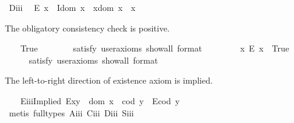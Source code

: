 \begin{isabellebody}
\ D\isactrlsub i\isactrlsub i\isactrlsub i{\isacharcolon}\ %
\ {\isachardoublequoteopen}E\ x\ \isactrlbold {\isasymrightarrow}\ {\isacharparenleft}I{\isacharparenleft}dom\ x{\isacharparenright}\ \isactrlbold {\isasymand}\ x{\isasymcdot}{\isacharparenleft}dom\ x{\isacharparenright}\ {\isasymcong}\ x{\isacharparenright}{\isachardoublequoteclose}%
\begin{isamarkuptext}%
The obligatory consistency check is positive.%
\end{isamarkuptext}\isamarkuptrue%
\ \ \isamarkupfalse%
\ True\ \ %
\isanewline
\ \ \ \ \isamarkupfalse%
\ {\isacharbrackleft}satisfy{\isacharcomma}\ user{\isacharunderscore}axioms{\isacharcomma}\ show{\isacharunderscore}all{\isacharcomma}\ format\ {\isacharequal}\ {}{\isacharbrackright}%
\isadelimproof
\ %
\endisadelimproof
%
\isatagproof
{}\isamarkupfalse%
%
\endisatagproof
{\isafoldproof}%
%
\isadelimproof
%
\endisadelimproof
\isanewline
\ \ \isamarkupfalse%
\ \ {\isachardoublequoteopen}{\isasymexists}x{\isachardot}\ \isactrlbold {\isasymnot}{\isacharparenleft}E\ x{\isacharparenright}{\isachardoublequoteclose}\ \ True\ \ %
\ \isanewline
\ \ \ \ \isamarkupfalse%
\ {\isacharbrackleft}satisfy{\isacharcomma}\ user{\isacharunderscore}axioms{\isacharcomma}\ show{\isacharunderscore}all{\isacharcomma}\ format\ {\isacharequal}\ {}{\isacharbrackright}%
\isadelimproof
\ %
\endisadelimproof
%
\isatagproof
{}\isamarkupfalse%
%
\endisatagproof
{\isafoldproof}%
%
\isadelimproof
%
\endisadelimproof
%
\begin{isamarkuptext}%
The left-to-right direction of existence axiom  is implied.%
\end{isamarkuptext}\isamarkuptrue%
\ \ \isamarkupfalse%
\ E\isactrlsub i\isactrlsub i\isactrlsub iImplied{\isacharcolon}\ {\isachardoublequoteopen}E{\isacharparenleft}x{\isasymcdot}y{\isacharparenright}\ \isactrlbold {\isasymrightarrow}\ {\isacharparenleft}dom\ x\ {\isasymcong}\ cod\ y\ \isactrlbold {\isasymand}\ E{\isacharparenleft}cod\ y{\isacharparenright}{\isacharparenright}{\isachardoublequoteclose}\ \isanewline
%
\isadelimproof
\ \ \ \ %
\endisadelimproof
%
\isatagproof
{}\isamarkupfalse%
\ {\isacharparenleft}metis\ {\isacharparenleft}full{\isacharunderscore}types{\isacharparenright}\ A\isactrlsub i\isactrlsub i\isactrlsub i\ C\isactrlsub i\isactrlsub i\isactrlsub i\ D\isactrlsub i\isactrlsub i\isactrlsub i\ S\isactrlsub i\isactrlsub i\isactrlsub i{\isacharparenright}%

\end{isabellebody}
